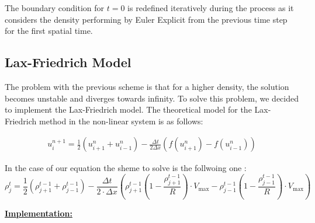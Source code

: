 \documentclass{article}
\begin{document}
		The boundary condition for \(t=0\) is redefined iteratively during the process as it considers the density performing by Euler Explicit from the previous time step for the first spatial time.


		\subsection{Lax-Friedrich Model}
		
		The problem with the previous scheme is that for a higher density, the solution becomes unstable and diverges towards infinity. To solve this problem, we decided to implement the Lax-Friedrich model. The theoretical model for the Lax-Friedrich method in the non-linear system is as follows:
		
		\begin{align}
			\boxed{u_{i}^{n+1} = \frac{1}{2}(u_{i+1}^{n} + u_{i-1}^{n}) - \frac{\Delta t}{2\Delta x}(f(u_{i+1}^{n}) - f(u_{i-1}^{n}))}
		\end{align}
		
		In the case of our equation the sheme to solve is the follwoing one : 
		\begin{equation}
			\boxed{
				\rho_{j}^t = \frac{1}{2} \left(\rho_{j+1}^{t-1} + \rho_{j-1}^{t-1}\right) - \frac{\Delta t}{2 \cdot \Delta x} \left( \rho_{j+1}^{t-1} \left(1 - \frac{\rho_{j+1}^{t-1}}{R}\right) \cdot V_{\text{max}} - \rho_{j-1}^{t-1} \left(1 - \frac{\rho_{j-1}^{t-1}}{R}\right) \cdot V_{\text{max}} \right)
			}
		\end{equation} \newpage
	
		
		\textbf{\underline{Implementation:}} \newline\newline
		
\end{document}
